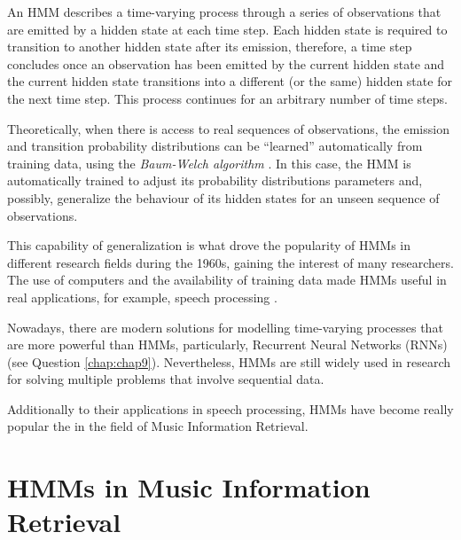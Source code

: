 
An HMM describes a time-varying process through a series of observations that are emitted by a hidden state at each time step. Each hidden state is required to transition to another hidden state after its emission, therefore, a time step concludes once an observation has been emitted by the current hidden state and the current hidden state transitions into a different (or the same) hidden state for the next time step. This process continues for an arbitrary number of time steps.




Theoretically, when there is access to real sequences of observations, the emission and transition probability distributions can be ``learned'' automatically from training data, using the \emph{Baum-Welch algorithm} \cite{rabiner_tutorial_1989}. In this case, the HMM is automatically trained to adjust its probability distributions parameters and, possibly, generalize the behaviour of its hidden states for an unseen sequence of observations.

This capability of generalization is what drove the popularity of HMMs in different research fields during the 1960s, gaining the interest of many researchers. The use of computers and the availability of training data made HMMs useful in real applications, for example, speech processing \cite{rabiner_introduction_1986}.

Nowadays, there are modern solutions for modelling time-varying processes that are more powerful than HMMs, particularly, Recurrent Neural Networks (RNNs) (see Question \ref{chap:chap9}). Nevertheless, HMMs are still widely used in research for solving multiple problems that involve sequential data.

Additionally to their applications in speech processing, HMMs have become really popular the in the field of Music Information Retrieval.

\section{HMMs in Music Information Retrieval}

